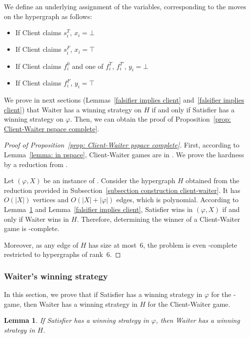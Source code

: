 \documentclass{article}
\newcommand{\PS}{\lang{Paired~SAT}\xspace}
\newcommand{\hyp}{H}
\newcommand{\hedge}{edge\xspace}
\newcommand{\hedges}{edges\xspace}
\newtheorem{lemma}[theorem]{Lemma}
\begin{document}
We define an underlying assignment of the variables, corresponding to the moves on the hypergraph as follows:
\begin{itemize}[noitemsep]
    \item If Client claims $s_i^T$, $x_i = \bot$
    \item If Client claims $s_i^F$, $x_i = \top$
    \item If Client claims $f_i^0$ and one of $f_i^T$, $f_i^{T'}$, $y_i = \bot$
    \item If Client claims $f_i^F$, $y_i = \top$
\end{itemize}


We prove in next sections (Lemmas~\ref{falsifier implies client} and~\ref{falsifier implies client}) that Waiter has a winning strategy on \(\hyp\) if and only if Satisfier has a winning strategy on \(\varphi\). Then, we can obtain the proof of Proposition~\ref{prop: Client-Waiter pspace complete}.

\begin{proof}[Proof of Proposition~\ref{prop: Client-Waiter pspace complete}]

First, according to Lemma~\ref{lemma: in pspace}, Client-Waiter games are in \PSPACE. We prove the hardness by a reduction from \PS.

Let $(\varphi,X)$ be an instance of \PS. Consider the hypergraph $\hyp$ obtained from the reduction provided in Subsection~\ref{subsection construction client-waiter}. It has $O(|X|)$ vertices and $O(|X| + |\varphi|)$ \hedges, which is polynomial. According to Lemma~\ref{Satisfier implies waiter} and Lemma~\ref{falsifier implies client}, Satisfier wins in $(\varphi, X)$ if and only if Waiter wins in $\hyp$. Therefore, determining the winner of a Client-Waiter game is \PSPACE-complete.

Moreover, as any \hedge of $\hyp$ has size at most~$6$, the problem is even \PSPACE-complete restricted to hypergraphs of rank~$6$.
\end{proof}


\subsubsection{Waiter's winning strategy} \label{subsection waiter}

In this section, we prove that if Satisfier has a winning strategy in $\varphi$ for the \PS-game, then Waiter has a winning strategy in $\hyp$ for the Client-Waiter game. 

\begin{lemma}\label{Satisfier implies waiter}
    If Satisfier has a winning strategy in $\varphi$, then Waiter has a winning strategy in $\hyp$. 
\end{lemma}
\end{document}
